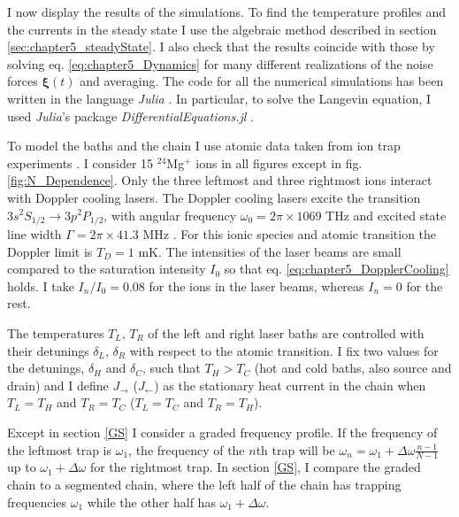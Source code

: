 I now display the results of the simulations. To find the temperature profiles and the currents in the steady state I use the algebraic method described in section \ref{sec:chapter5_steadyState}. I also check that the results coincide with those by solving eq. \eqref{eq:chapter5_Dynamics} for many different realizations of the noise forces $\bm\xi (t)$ and averaging. The code for all the numerical simulations has been written in the language \textit{Julia} \cite{Bezanson2012,Bezanson2017}. In particular, to solve the Langevin equation, I used \textit{Julia}'s package \textit{DifferentialEquations.jl} \cite{Rackauckas2017}.

To model the baths and the chain I use atomic data taken from ion trap experiments \cite{Leupold2015,Lo2015}. I consider 15 $^{24}$Mg$^+$ ions in all figures except in fig. \ref{fig:N_Dependence}. Only the three leftmost and three rightmost ions interact with Doppler cooling lasers. The Doppler cooling lasers excite the transition $3s^2S_{1/2}\rightarrow 3p^2P_{1/2}$, with angular frequency $\omega_0 = 2 \pi \times 1069$ THz and excited state line width $\Gamma = 2\pi \times 41.3$ MHz \cite{Ruiz2014}. For this ionic species and atomic transition the Doppler limit is $T_D = 1$ mK.
The intensities of the laser beams are small compared to the saturation intensity $I_0$ so that eq. \eqref{eq:chapter5_DopplerCooling} holds. I take $I_n/I_0 = 0.08$ for the ions  in the laser beams, whereas  $I_n=0$ for the rest.

The temperatures $T_L,\,T_R$ of the left and right laser baths are controlled with their detunings $\delta_L,\,\delta_R$ with respect to the atomic transition. I fix two values for the detunings, $\delta_H$ and $\delta_C$, such that $T_H>T_C$ (hot and cold baths, also source and drain) and I define $J_\rightarrow$ ($J_\leftarrow$) as the stationary heat current in the chain when $T_L = T_H$ and $T_R = T_C$ ($T_L = T_C$ and $T_R = T_H$).

Except in section \ref{GS} I consider a graded frequency profile.
If the frequency of the leftmost trap is $\omega_1$, the frequency of the $n$th trap will be $\omega_n = \omega_1 +\Delta\omega\frac{n-1}{N-1}$ up to $\omega_1 +\Delta\omega$ for the rightmost trap. In
section \ref{GS}, I compare the graded chain to a segmented chain, where the left half of the chain has trapping frequencies $\omega_1$ while the other half has $\omega_1 +\Delta\omega$.


